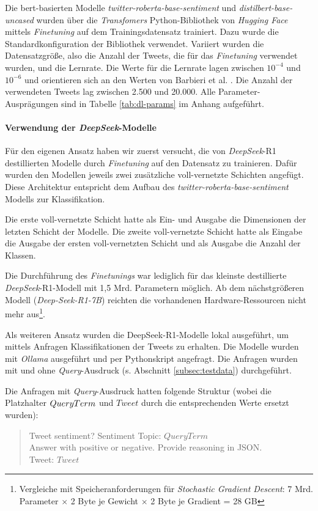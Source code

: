 Die \gls{bert}-basierten Modelle \textit{twitter-roberta\hyp{}base\hyp{}sentiment} und \textit{distilbert-base-uncased} wurden über die \textit{Transfomers} Python-Bibliothek von \textit{Hugging Face} mittels \textit{Finetuning} auf dem Trainingsdatensatz trainiert.
Dazu wurde die Standardkonfiguration der Bibliothek verwendet.
Variiert wurden die Datensatzgröße, also die Anzahl der Tweets, die für das \textit{Finetuning} verwendet wurden, und die Lernrate.
Die Werte für die Lernrate lagen zwischen $10^{-4}$ und $10^{-6}$ und orientieren sich an den Werten von Barbieri et al. \cite{barbieri2020tweeteval}.
Die Anzahl der verwendeten Tweets lag zwischen 2.500 und 20.000.
Alle Parameter-Ausprägungen sind in Tabelle \ref{tab:dl-params} im Anhang aufgeführt.

\paragraph{Verwendung der \textit{DeepSeek}-Modelle}

Für den eigenen Ansatz haben wir zuerst versucht, die von \textit{DeepSeek}-R1 destillierten Modelle durch \textit{Finetuning} auf den Datensatz zu trainieren.
Dafür wurden den Modellen jeweils zwei zusätzliche voll-vernetzte Schichten angefügt.
Diese Architektur entspricht dem Aufbau des \textit{twitter-roberta-base-sentiment} Modells zur Klassifikation.

Die erste voll-vernetzte Schicht hatte als Ein- und Ausgabe die Dimensionen der letzten Schicht der Modelle.
Die zweite voll-vernetzte Schicht hatte als Eingabe die Ausgabe der ersten voll-vernetzten Schicht und als Ausgabe die Anzahl der Klassen.

Die Durchführung des \textit{Finetunings} war lediglich für das kleinste destillierte \textit{DeepSeek}-R1-Modell mit 1,5 Mrd. Parametern möglich.
Ab dem nächstgrößeren Modell (\textit{Deep\hyp{}Seek-R1-7B}) reichten die vorhandenen Hardware-Ressourcen nicht mehr aus\footnote{Vergleiche mit Speicheranforderungen für \textit{Stochastic Gradient Descent}: 7 Mrd. Parameter $\times$ 2 Byte je Gewicht $\times$ 2 Byte je Gradient = 28 GB}.

Als weiteren Ansatz wurden die DeepSeek-R1-Modelle lokal ausgeführt, um mittels Anfragen Klassifikationen der Tweets zu erhalten.
Die Modelle wurden mit \textit{Ollama} ausgeführt und per Pythonskript angefragt.
Die Anfragen wurden mit und ohne \textit{Query}-Ausdruck (s. Abschnitt \ref{subsec:testdata}) durchgeführt.

Die Anfragen mit \textit{Query}-Ausdruck hatten folgende Struktur (wobei die Platzhalter $Query\-Term$ und $Tweet$ durch die entsprechenden Werte ersetzt wurden):
\begin{quote}
    Tweet sentiment? Sentiment Topic: $QueryTerm$\\
    Answer with positive or negative. Provide reasoning in JSON.\\
    Tweet: $Tweet$
\end{quote}

